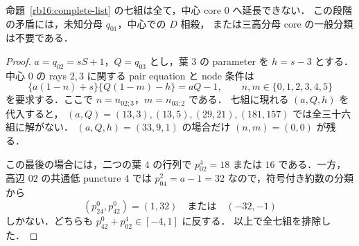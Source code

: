 \begin{proposition}[$B$ 型葉の中心への延長障害]
\label{rb16:no-B-extension}
命題~\ref{rb16:complete-list} の七組は全て，中心 core $0$ へ延長できない．
この段階の矛盾には，未知分母 $q_{01}$，中心での $D$ 相殺，
または三高分母 core の一般分類は不要である．
\end{proposition}

\begin{proof}
$a=q_{02}=sS+1$，$Q=q_{03}$ とし，葉 $3$ の parameter を $h=s-3$ とする．
中心 $0$ の rays $2,3$ に関する pair equation と node 条件は
\begin{equation}\label{rb16:center-pair}
 \{a(1-n)+s\}\{Q(1-m)-h\}=aQ-1,
 \qquad n,m\in\{0,1,2,3,4,5\}
\end{equation}
を要求する．ここで $n=n_{02;3}$，$m=n_{03;2}$ である．
七組に現れる $(a,Q,h)$ を代入すると，
$(a,Q)=(13,3),(13,5),(29,21),(181,157)$ では全三十六組に解がない．
$(a,Q,h)=(33,9,1)$ の場合だけ $(n,m)=(0,0)$ が残る．

この最後の場合には，二つの葉 $4$ の行列で
$p^4_{02}=18$ または $16$ である．一方，高辺 $02$ の共通低 puncture $4$ では
$p^2_{04}=a-1=32$ なので，符号付き約数の分類から
\[
 (p^0_{24},p^0_{42})=(1,32)\quad\text{または}\quad(-32,-1)
\]
しかない．どちらも $p^0_{42}+p^4_{02}\in[-4,1]$ に反する．
以上で全七組を排除した．
\end{proof}
